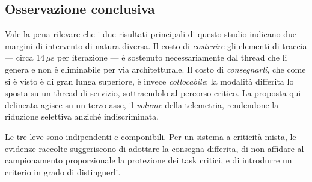 \documentclass[11pt,a4paper]{article}
\newcommand{\us}{\,$\mu$s}
\begin{document}
\subsection{Osservazione conclusiva}

Vale la pena rilevare che i due risultati principali di questo studio indicano due margini di
intervento di natura diversa. Il costo di \emph{costruire} gli elementi di traccia --- circa 14\us{}
per iterazione --- \`e sostenuto necessariamente dal thread che li genera e non \`e eliminabile per
via architetturale. Il costo di \emph{consegnarli}, che come si \`e visto \`e di gran lunga
superiore, \`e invece \emph{collocabile}: la modalit\`a differita lo sposta su un thread di
servizio, sottraendolo al percorso critico. La proposta qui delineata agisce su un terzo asse, il
\emph{volume} della telemetria, rendendone la riduzione selettiva anzich\'e indiscriminata.

Le tre leve sono indipendenti e componibili. Per un sistema a criticit\`a mista, le evidenze
raccolte suggeriscono di adottare la consegna differita, di non affidare al campionamento
proporzionale la protezione dei task critici, e di introdurre un criterio in grado di distinguerli.
\end{document}
